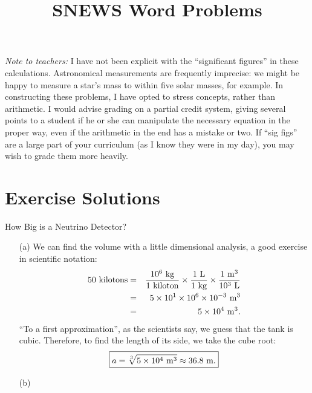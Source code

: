 \documentclass[12pt]{article}
\begin{document}
\title{SNEWS Word Problems}
\author{}
\date{}
\maketitle

{\em Note to teachers:}  I have not been explicit with the
``significant figures'' in these calculations.  Astronomical
measurements are frequently imprecise:  we might be happy to measure a
star's mass to within five solar masses, for example.  In constructing
these problems, I have opted to stress concepts, rather than
arithmetic.  I would advise grading on a partial credit system, giving
several points to a student if he or she can manipulate the necessary
equation in the proper way, even if the arithmetic in the end has a
mistake or two.  If ``sig figs'' are a large part of your curriculum
(as I know they were in my day), you may wish to grade them more heavily.

\section{Exercise Solutions}

\begin{probdesc}{1}{How Big is a Neutrino Detector?}

\begin{enumerate}
\item[(a)] 
We can find the volume with a little dimensional analysis, a good
exercise in scientific notation:
\begin{eqnarray}
50{\rm\ kilotons} &=& \frac{10^6 {\rm\ kg}}{1 {\rm\ kiloton}}
  \times \frac{1 {\rm\ L}}{1 {\rm\ kg}}
  \times \frac{1 {\rm\ m}^3}{10^3 {\rm\ L}} \nonumber\\
&=& 5 \times 10^1 \times 10^6 \times 10^{-3} {\rm\ m}^3 \nonumber\\
&=& 5 \times 10^4 {\rm\ m}^3.\nonumber
\end{eqnarray}
``To a first approximation'', as the scientists say, we guess that the
tank is cubic.  Therefore, to find the length of its side, we take the
cube root:
\begin{equation}
\boxed{a = \sqrt[3]{5\times10^4 {\rm\ m}^3} \approx 36.8 {\rm\ m}.}
\end{equation}

\item[(b)]
\end{enumerate}

\end{probdesc}
\end{document}
